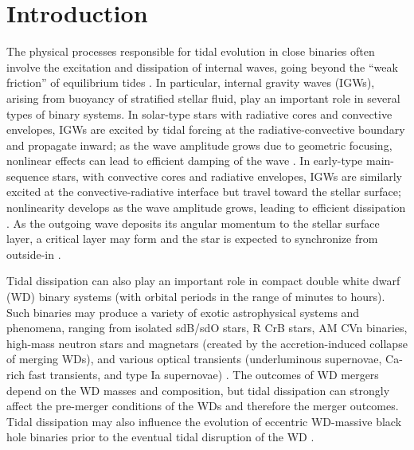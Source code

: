 \documentclass[
        fleqn,
        usenatbib,
    ]{mnras}
\begin{document}

\section{Introduction}\label{s:intro}

The physical processes responsible for tidal evolution in close binaries often
involve the excitation and dissipation of internal waves, going beyond the
``weak friction'' of equilibrium tides \citep[see][for a
review]{ogilvie2014tidal}. In particular, internal gravity waves (IGWs), arising
from buoyancy of stratified stellar fluid, play an important role in several
types of binary systems. In solar-type stars with radiative cores and convective
envelopes, IGWs are excited by tidal forcing at the radiative-convective
boundary and propagate inward; as the wave amplitude grows due to geometric
focusing, nonlinear effects can lead to efficient damping of the wave
\citep{goodman1998dynamical,barker_ogilvie,essick2015orbital}. In early-type
main-sequence stars, with convective cores and radiative envelopes, IGWs are
similarly excited at the convective-radiative interface but travel toward the
stellar surface; nonlinearity develops as the wave amplitude grows, leading to
efficient dissipation \citep{zahn75,zahn77}. As the outgoing wave deposits its
angular momentum to the stellar surface layer, a critical layer may form and the
star is expected to synchronize from outside-in \citep{gn89}.

Tidal dissipation can also play an important role in compact double white dwarf
(WD) binary systems (with orbital periods in the range of minutes to hours).
Such binaries may produce a variety of exotic astrophysical systems and
phenomena, ranging from isolated sdB/sdO stars, R CrB stars, AM CVn binaries,
high-mass neutron stars and magnetars (created by the accretion-induced collapse
of merging WDs), and various optical transients (underluminous supernovae,
Ca-rich fast transients, and type Ia supernovae)
\citep[e.g.][]{livio2018progenitors,toloza2019understanding}. The outcomes of WD
mergers depend on the WD masses and composition, but tidal dissipation can
strongly affect the pre-merger conditions of the WDs and therefore the merger
outcomes. Tidal dissipation may also influence the evolution of eccentric
WD-massive black hole binaries prior to the eventual tidal disruption of the WD
\citep{vick2017tidal}.
\end{document}

